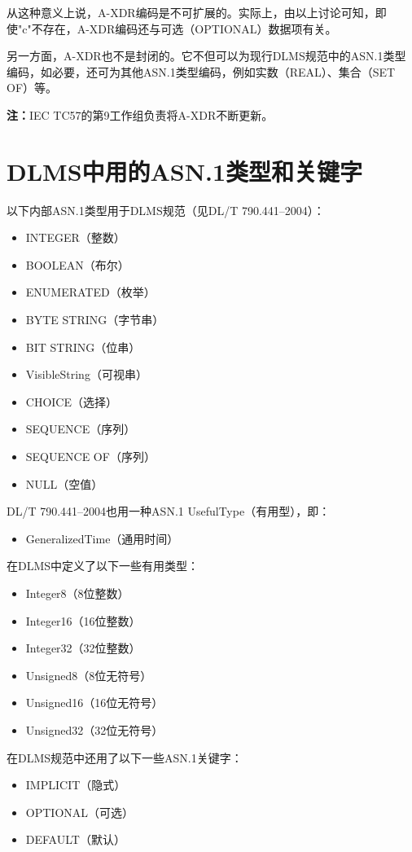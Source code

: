 \documentclass[a4paper,11pt]{ctexart}
\begin{document}
从这种意义上说，A-XDR编码是不可扩展的。实际上，由以上讨论可知，即使"c"不存在，A-XDR编码还与可选（OPTIONAL）数据项有关。

另一方面，A-XDR也不是封闭的。它不但可以为现行DLMS规范中的ASN.1类型编码，如必要，还可为其他ASN.1类型编码，例如实数（REAL）、集合（SET OF）等。

\noindent\textbf{注：}IEC TC57的第9工作组负责将A-XDR不断更新。

\section{DLMS中用的ASN.1类型和关键字}

以下内部ASN.1类型用于DLMS规范（见DL/T 790.441--2004）：
\begin{itemize}[leftmargin=2em]
\item INTEGER（整数）
\item BOOLEAN（布尔）
\item ENUMERATED（枚举）
\item BYTE STRING（字节串）
\item BIT STRING（位串）
\item VisibleString（可视串）
\item CHOICE（选择）
\item SEQUENCE（序列）
\item SEQUENCE OF（序列）
\item NULL（空值）
\end{itemize}

DL/T 790.441--2004也用一种ASN.1 UsefulType（有用型），即：
\begin{itemize}[leftmargin=2em]
\item GeneralizedTime（通用时间）
\end{itemize}

\noindent 在DLMS中定义了以下一些有用类型：
\begin{itemize}[leftmargin=2em]
\item Integer8（8位整数）
\item Integer16（16位整数）
\item Integer32（32位整数）
\item Unsigned8（8位无符号）
\item Unsigned16（16位无符号）
\item Unsigned32（32位无符号）
\end{itemize}

\noindent 在DLMS规范中还用了以下一些ASN.1关键字：
\begin{itemize}[leftmargin=2em]
\item IMPLICIT（隐式）
\item OPTIONAL（可选）
\item DEFAULT（默认）
\end{itemize}
\end{document}
